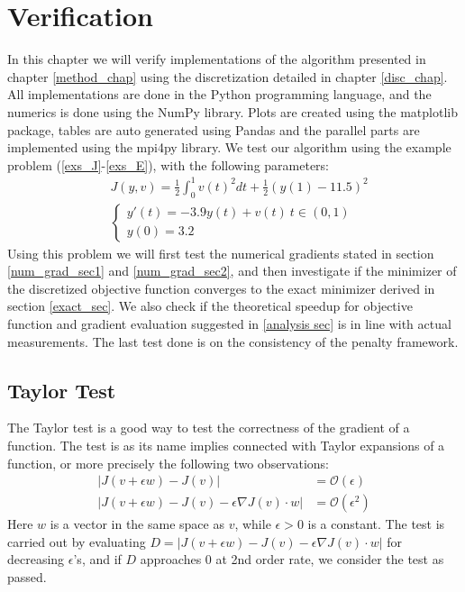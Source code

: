 \chapter{Verification}\label{Verification chapter}
In this chapter we will verify implementations of the algorithm presented in chapter \ref{method_chap} using the discretization detailed in chapter \ref{disc_chap}. All implementations are done in the Python programming language, and the numerics is done using the NumPy\cite{walt2011numpy} library. Plots are created using the matplotlib\cite{Hunter:2007} package, tables are auto generated using Pandas\cite{mckinney2010data} and the parallel parts are implemented using the mpi4py\cite{dalcin2007mpi4py} library. We test our algorithm using the example problem (\ref{exs_J}-\ref{exs_E}), with the following parameters:
\begin{align}
&J(y,v) = \frac{1}{2}\int_0^1v(t)^2dt + \frac{1}{2}(y(1)-11.5)^2 \label{test_J}\\
&\left\{
     \begin{array}{lr}
       	y'(t) = -3.9y(t)+v(t) \ t\in(0,1)\\
       	y(0)=3.2
     \end{array}
   \right. \label{test_E}
\end{align}
Using this problem we will first test the numerical gradients stated in section \ref{num_grad_sec1} and \ref{num_grad_sec2}, and then investigate if the minimizer of the discretized objective function converges to the exact minimizer derived in section \ref{exact_sec}. We also check if the theoretical speedup for objective function and gradient evaluation suggested in \ref{analysis sec} is in line with actual measurements. The last test done is on the consistency of the penalty framework. 
\section{Taylor Test} \label{Taylor_sec}
The Taylor test is a good way to test the correctness of the gradient of a function. The test is as its name implies connected with Taylor expansions of a function, or more precisely the following two observations:
\begin{align*}
|J(v+\epsilon w)-J(v)| &= \mathcal{O}(\epsilon) \\
|J(v+\epsilon w)-J(v)-\epsilon\nabla J(v)\cdot w| &= \mathcal{O}(\epsilon^2)
\end{align*}
Here $w$ is a vector in the same space as $v$, while $\epsilon>0$ is a constant. The test is carried out by evaluating $D=|J(v+\epsilon w)-J(v)-\epsilon\nabla J(v)\cdot w|$ for decreasing $\epsilon$'s, and if $D$ approaches 0 at 2nd order rate, we consider the test as passed.
